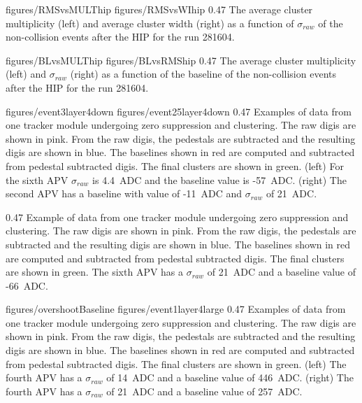                  {figures/RMSvsMULThip} %
                 {figures/RMSvsWIhip} %
                 {0.47}       %
                 {The average cluster multiplicity (left) and average cluster width (right) as a function of $\sigma_{raw}$ of the non-collision events after the HIP for the run 281604.  } %

                 {figures/BLvsMULThip} %
                 {figures/BLvsRMShip} %
                 {0.47}       %
                 { The average cluster multiplicity (left) and $\sigma_{raw}$ (right) as a function of the baseline  of the non-collision events after the HIP for the run 281604. } %


                 {figures/event3layer4down} %
                 {figures/event25layer4down} %
                 {0.47}       %
                 {Examples of data from one tracker module undergoing zero suppression and clustering. The raw digis are shown in pink. From the raw digis, the pedestals are subtracted and the resulting digis are shown in blue. The baselines shown in red are computed and subtracted from pedestal subtracted digis. The final clusters are shown in green. (left) For the sixth APV  $\sigma_{raw}$ is 4.4~ADC and the baseline value is -57~ADC. (right)  The second APV has a baseline with value of -11~ADC and  $\sigma_{raw}$ of 21~ADC.} %

                 {0.47}       %
                 {Example of data from one tracker module undergoing zero suppression and clustering. The raw digis are shown in pink. From the raw digis, the pedestals are subtracted and the resulting digis are shown in blue. The baselines shown in red are computed and subtracted from pedestal subtracted digis. The final clusters are shown in green. The sixth APV has a $\sigma_{raw}$ of 21~ADC and a baseline value of -66~ADC.} %


                 {figures/overshootBaseline} %
                 {figures/event1layer4large} %
                 {0.47}       %
                 { Examples of data from one tracker module undergoing zero suppression and clustering. The raw digis are shown in pink. From the raw digis, the pedestals are subtracted and the resulting digis are shown in blue. The baselines shown in red are computed and subtracted from pedestal subtracted digis. The final clusters are shown in green. (left) The fourth APV has a $\sigma_{raw}$ of 14~ADC and a baseline value of 446~ADC. (right)  The fourth APV has a $\sigma_{raw}$ of 21~ADC and a baseline value of 257~ADC.} %


